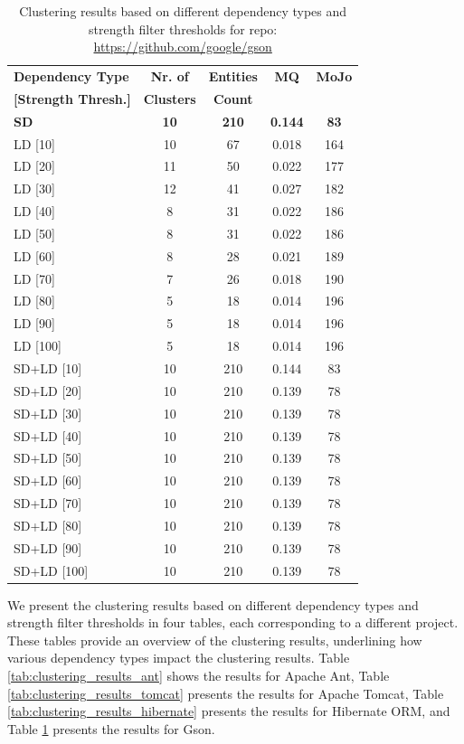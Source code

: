 \documentclass{ieeeaccess}
\begin{document}
\begin{table}
\caption{Clustering results based on different dependency types and strength filter thresholds for repo: \href{https://github.com/google/gson}{https://github.com/google/gson}}
\label{tab:clustering_results_gson}
\centering
\setlength{\tabcolsep}{3pt}
\begin{tabular}{|l|c|c|c|c|}
\hline
\textbf{Dependency Type} & \textbf{Nr. of} & \textbf{Entities} & \textbf{MQ} & \textbf{MoJo} \\
\textbf{[Strength Thresh.]} & \textbf{Clusters} & \textbf{Count} &  &  \\
\hline
\textbf{SD} & \textbf{10} & \textbf{210} & \textbf{0.144} & \textbf{83} \\
\hline
LD [10] & 10 & 67 & 0.018 & 164 \\
LD [20] & 11 & 50 & 0.022 & 177 \\
LD [30] & 12 & 41 & 0.027 & 182 \\
LD [40] & 8 & 31 & 0.022 & 186 \\
LD [50] & 8 & 31 & 0.022 & 186 \\
LD [60] & 8 & 28 & 0.021 & 189 \\
LD [70] & 7 & 26 & 0.018 & 190 \\
LD [80] & 5 & 18 & 0.014 & 196 \\
LD [90] & 5 & 18 & 0.014 & 196 \\
LD [100] & 5 & 18 & 0.014 & 196 \\
\hline
SD+LD [10] & 10 & 210 & 0.144 & 83 \\
SD+LD [20] & 10 & 210 & 0.139 & 78 \\
SD+LD [30] & 10 & 210 & 0.139 & 78 \\
SD+LD [40] & 10 & 210 & 0.139 & 78 \\
SD+LD [50] & 10 & 210 & 0.139 & 78 \\
SD+LD [60] & 10 & 210 & 0.139 & 78 \\
SD+LD [70] & 10 & 210 & 0.139 & 78 \\
SD+LD [80] & 10 & 210 & 0.139 & 78 \\
SD+LD [90] & 10 & 210 & 0.139 & 78 \\
SD+LD [100] & 10 & 210 & 0.139 & 78 \\
\hline
\end{tabular}
\end{table}



We present the clustering results based on different dependency types and strength filter thresholds in four tables, each corresponding to a different project. These tables provide an overview of the clustering results, underlining how various dependency types impact the clustering results. Table \ref{tab:clustering_results_ant} shows the results for Apache Ant, Table \ref{tab:clustering_results_tomcat} presents the results for Apache Tomcat, Table \ref{tab:clustering_results_hibernate} presents the results for Hibernate ORM, and Table \ref{tab:clustering_results_gson} presents the results for Gson.
\end{document}

